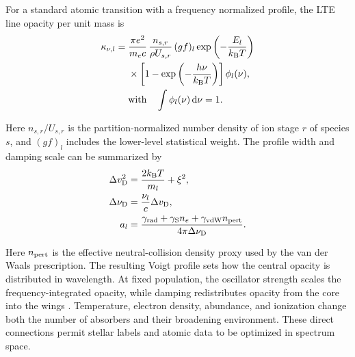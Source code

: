 \begin{EN}
For a standard atomic transition with a frequency normalized profile, the LTE
line opacity per unit mass is \citep{Gray2005}
\begin{equation}
\begin{aligned}
\kappa_{\nu,l}={}&
\frac{\pi e^2}{m_e c}\,
\frac{n_{s,r}}{\rho U_{s,r}}\,(gf)_l
\exp\left(-\frac{E_l}{k_{\rm B}T}\right) \\
&{}\times
\left[1-\exp\left(-\frac{h\nu}{k_{\rm B}T}\right)\right]\phi_l(\nu), \\
&\text{with}\quad \int\phi_l(\nu)\,\mathrm{d}\nu=1 .
\end{aligned}
\end{equation}

\noindent Here $n_{s,r}/U_{s,r}$ is the partition-normalized number density of
ion stage $r$ of species $s$, and $(gf)_l$ includes the lower-level statistical
weight. The profile width and
damping scale can be summarized by
\begin{equation}
\begin{aligned}
\Delta v_{\rm D}^{2} &=
\frac{2k_{\rm B}T}{m_l}+\xi^2, \\
\Delta\nu_{\rm D} &= \frac{\nu_l}{c}\Delta v_{\rm D}, \\
a_l &=
\frac{\gamma_{\rm rad}+\gamma_{\rm S}n_e+
\gamma_{\rm vdW}n_{\rm pert}}{4\pi\Delta\nu_{\rm D}} .
\end{aligned}
\end{equation}

\noindent Here $n_{\rm pert}$ is the effective neutral-collision density proxy
used by the van der Waals prescription.
The resulting Voigt profile sets how the central opacity is distributed in
wavelength. At fixed population, the oscillator strength scales the
frequency-integrated opacity, while damping redistributes opacity from the
core into the wings \citep{Barklem2000,Gray2005}. Temperature, electron density, abundance,
and ionization change both the number of absorbers and their broadening
environment. These direct connections permit stellar labels and atomic data
to be optimized in spectrum space.
\end{EN}


